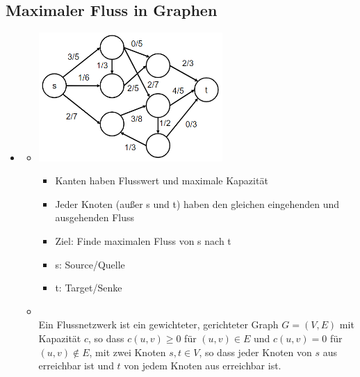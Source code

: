 \documentclass[
    ngerman,
    color=3b,
    dark_mode,
    load_common, %
    summary,
    boxarc,
]{tuda_summary}
\begin{document}
\subsection{Maximaler Fluss in Graphen}
\begin{itemize}
    \item {}
          \begin{itemize}
              \item[]
                    \begin{minipage}{0.35\textwidth}
                        \includegraphics[width=7cm]{pictures/flussIdee.PNG}
                    \end{minipage}
                    \begin{minipage}{0.55\textwidth}
                        \begin{itemize}
                            \item Kanten haben Flusswert und maximale Kapazität
                            \item Jeder Knoten (außer s und t) haben den gleichen eingehenden und ausgehenden Fluss
                            \item Ziel: Finde maximalen Fluss von s nach t
                            \item s: Source/Quelle
                            \item t: Target/Senke
                        \end{itemize}
                    \end{minipage}
              \item {} \\
                    Ein Flussnetzwerk ist ein gewichteter, gerichteter Graph $G=(V,E)$ mit Kapazität $c$, so dass
                    $c(u,v) \geq 0$ für $(u,v) \in E$ und $c(u,v) = 0$ für $(u,v) \notin E$, mit zwei Knoten $s,t \in V$,
                    so dass jeder Knoten von $s$ aus erreichbar ist und $t$ von jedem Knoten aus erreichbar ist.

\end{itemize}
\end{itemize}
\end{document}
